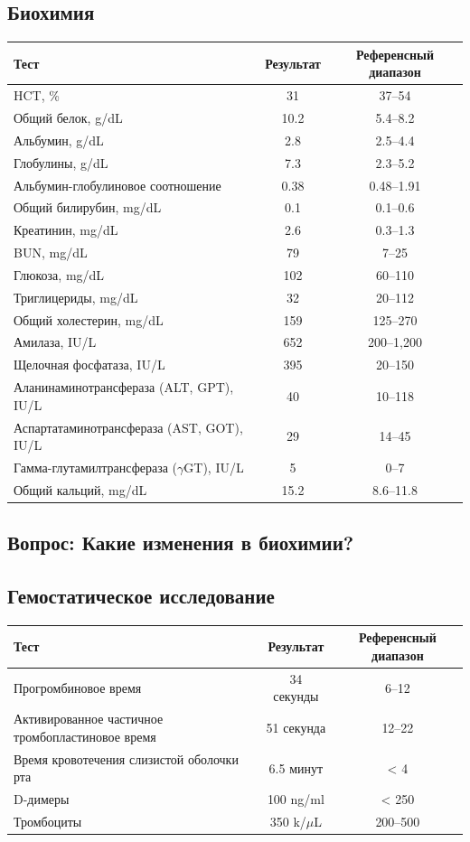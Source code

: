 \documentclass[a4paper,12pt]{book}
\begin{document}
\subsection*{Биохимия}
\begin{tabular}{lcc}
\toprule
Тест & Результат & Референсный диапазон \\
\midrule
HCT, \% & 31 & 37--54 \\
Общий белок, g/dL & 10.2 & 5.4--8.2 \\
Альбумин, g/dL & 2.8 & 2.5--4.4 \\
Глобулины, g/dL & 7.3 & 2.3--5.2 \\
Альбумин-глобулиновое соотношение & 0.38 & 0.48--1.91 \\
Общий билирубин, mg/dL & 0.1 & 0.1--0.6 \\
Креатинин, mg/dL & 2.6 & 0.3--1.3 \\
BUN, mg/dL & 79 & 7--25 \\
Глюкоза, mg/dL & 102 & 60--110 \\
Триглицериды, mg/dL & 32 & 20--112 \\
Общий холестерин, mg/dL & 159 & 125--270 \\
Амилаза, IU/L & 652 & 200--1,200 \\
Щелочная фосфатаза, IU/L & 395 & 20--150 \\
Аланинаминотрансфераза (ALT, GPT), IU/L & 40 & 10--118 \\
Аспартатаминотрансфераза (AST, GOT), IU/L & 29 & 14--45 \\
Гамма-глутамилтрансфераза ($\gamma$GT), IU/L & 5 & 0--7 \\
Общий кальций, mg/dL & 15.2 & 8.6--11.8 \\
\bottomrule
\end{tabular}

\subsection*{Вопрос: Какие изменения в биохимии?}

\subsection*{Гемостатическое исследование}
\begin{tabular}{lcc}
\toprule
Тест & Результат & Референсный диапазон \\
\midrule
Прогромбиновое время & 34 секунды & 6--12 \\
Активированное частичное тромбопластиновое время & 51 секунда & 12--22 \\
Время кровотечения слизистой оболочки рта & 6.5 минут & < 4 \\
D-димеры & 100 ng/ml & < 250 \\
Тромбоциты & 350 k/$\mu$L & 200--500 \\
\bottomrule
\end{tabular}
\end{document}
